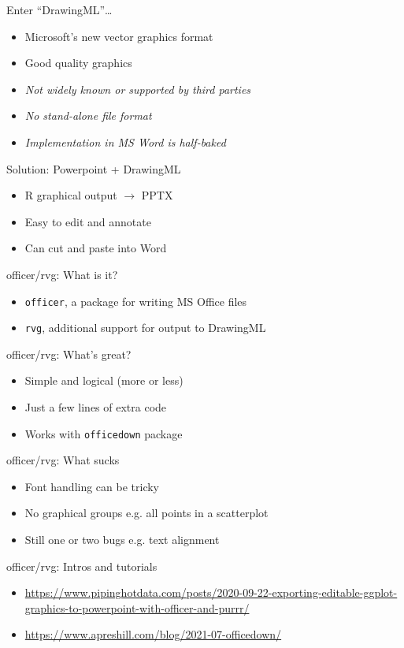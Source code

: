 \documentclass[aspectratio=169,12pt]{beamer} %
\begin{document}
\begin{frame}{Enter ``DrawingML''\dots}
	\begin{itemize}
		\item Microsoft's new vector graphics format
		\item Good quality graphics
		\item \emph{Not widely known or supported by third parties}
		\item \emph{No stand-alone file format}
		\item \emph{Implementation in MS Word is half-baked}
	\end{itemize}
\end{frame}

\begin{frame}{Solution: Powerpoint + DrawingML}
	\begin{itemize}
		\item R graphical output $\rightarrow$ PPTX
		\item Easy to edit and annotate
		\item Can cut and paste into Word
	\end{itemize}
\end{frame}

\begin{frame}{officer/rvg: What is it?}
	\begin{itemize}
		\item \texttt{officer}, a package for writing MS Office files
		\item \texttt{rvg}, additional support for output to DrawingML
	\end{itemize}
\end{frame}

\begin{frame}{officer/rvg: What's great?}
	\begin{itemize}
		\item Simple and logical (more or less)
		\item Just a few lines of extra code
		\item Works with \texttt{officedown} package
	\end{itemize}
\end{frame}

\begin{frame}{officer/rvg: What sucks}
	\begin{itemize}
		\item Font handling can be tricky
		\item No graphical groups e.g. all points in a scatterplot
		\item Still one or two bugs e.g. text alignment
	\end{itemize}
\end{frame}

\begin{frame}{officer/rvg: Intros and tutorials}
	\begin{itemize}
		\item \scriptsize{\url{https://www.pipinghotdata.com/posts/2020-09-22-exporting-editable-ggplot-graphics-to-powerpoint-with-officer-and-purrr/}}
		\item \scriptsize{\url{https://www.apreshill.com/blog/2021-07-officedown/}}
	\end{itemize}
\end{frame}
\end{document}
